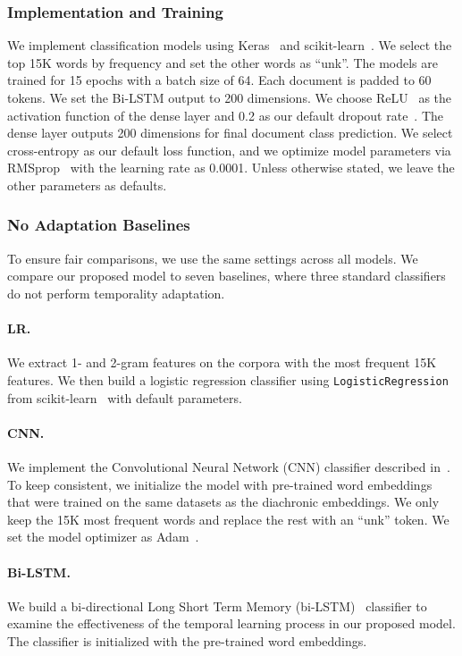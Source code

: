 \subsubsection{Implementation and Training}
We implement classification models using Keras~\cite{chollet2015keras} and scikit-learn~\cite{pedregosa2011scikit}. We select the top 15K words by frequency and set the other words as ``unk''. The models are trained for 15 epochs with a batch size of 64. Each document is padded to 60 tokens. We set the Bi-LSTM output to 200 dimensions. We choose ReLU~\cite{hahnloser2000digital} as the activation function of the dense layer and 0.2 as our default dropout rate~\cite{srivastava2014dropout}. The dense layer outputs 200 dimensions for final document class prediction. We select cross-entropy as our default loss function, and we optimize model parameters via RMSprop~\cite{tieleman2012lecture} with the learning rate as 0.0001. Unless otherwise stated, we leave the other parameters as defaults.

\subsubsection{No Adaptation Baselines}
To ensure fair comparisons, we use the same settings across all models. We compare our proposed model to seven baselines, where three standard classifiers do not perform temporality adaptation.

\paragraph{LR.} 
We extract 1- and 2-gram features on the corpora with the most frequent 15K features. We then build a logistic regression classifier using \texttt{LogisticRegression} from scikit-learn~\cite{pedregosa2011scikit} with default parameters.

\paragraph{CNN.} 
We implement the Convolutional Neural Network (CNN) classifier described in~\cite{kim2014convolutional}. To keep consistent, we initialize the model with pre-trained word embeddings~\cite{bojanowski2017enriching} that were trained on the same datasets as the diachronic embeddings. We only keep the 15K most frequent words and replace the rest with an ``unk'' token. 
We set the model optimizer as Adam~\cite{kingma2014adam}. 

\paragraph{Bi-LSTM.} 
We build a bi-directional Long Short Term Memory (bi-LSTM)~\cite{hochreiter1997long} classifier to examine the effectiveness of the temporal learning process in our proposed model. The classifier is initialized with the pre-trained word embeddings.

